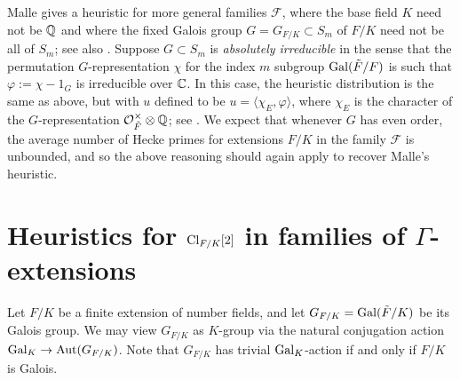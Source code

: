 \documentclass[11pt,a4paper]{amsart}
\def\Q{{\rm \mathbb{Q}}}
\def\C{{\rm \mathbb{C}}}
\def\O{{\rm \mathcal{O}}}
\def\Aut{{\rm Aut}}
\def\Cl{{\rm Cl}}
\def\Gal{{\rm Gal}}
\numberwithin{equation}{section}
\begin{document}
Malle gives a heuristic for more general families $\mathcal{F}$, where the base field $K$ need not be $\Q$ and where the fixed Galois group $G = G_{F/K} \subset S_m$  of $F/K$ need not be all of $S_m$; see also \cite{AdamMalle}. Suppose $G \subset S_m$ is {\it absolutely irreducible} in the sense that the permutation $G$-representation $\chi$ for the index $m$ subgroup $\Gal(\tilde F/F)$ is such that $\varphi:= \chi - 1_G$ is irreducible over $\C$.  In this case, the heuristic distribution is the same as above, but with $u$ defined to be $u = \langle \chi_E, \varphi\rangle $, where $\chi_E$ is the character of the $G$-representation $\O_{\tilde F}^\times \otimes \Q$; see \cite[p.\ 466]{Malle2010}.  We expect that whenever $G$ has even order, the average number of Hecke primes for extensions $F/K$ in the family $\mathcal{F}$ is unbounded, and so the above reasoning should again apply to recover Malle's heuristic.  




\section{Heuristics for $\Cl_{F/K}[2]$ in families of  $\Gamma$-extensions}\label{sec: Gamma-extension heuristics}

Let $F/K$ be a finite extension of number fields, and let $G_{F/K} = \Gal(\tilde F/K)$ be its Galois group. We may view $G_{F/K}$ as  $K$-group via the natural conjugation action $\Gal_K \to \Aut(G_{F/K})$.  Note that $G_{F/K}$ has trivial $\Gal_K$-action if and only if $F/K$ is Galois. 
\end{document}
